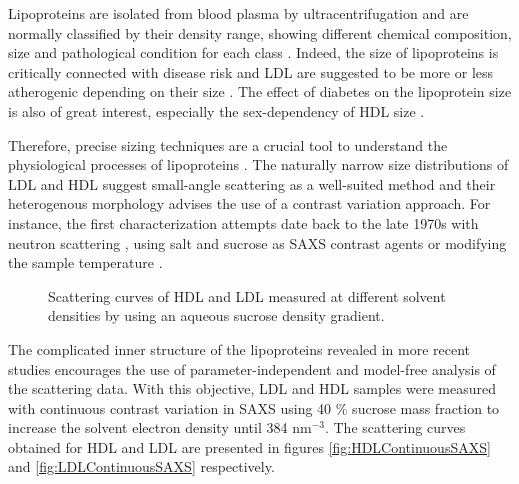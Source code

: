 Lipoproteins are isolated from blood plasma by ultracentrifugation \citep{havel_distribution_1955} and are normally classified by their density range, showing different chemical composition, size and pathological condition for each class \citep{german_lipoproteins:_2006}. Indeed, the size of lipoproteins is critically connected with disease risk \citep{gardner_cd_association_1996} and LDL are suggested to be more or less atherogenic depending on their size \citep{dreon_low-density_1994}. The effect of diabetes on the lipoprotein size is also of great interest, especially the sex-dependency of HDL size \citep{colhoun_lipoprotein_2002}.

Therefore, precise sizing techniques are a crucial tool to understand the physiological processes of lipoproteins \citep{german_lipoproteins:_2006}. The naturally narrow size distributions of LDL and HDL suggest small-angle scattering as a well-suited method and their heterogenous morphology advises the use of a contrast variation approach. For instance, the first characterization attempts date back to the late 1970s with neutron scattering \citep{stuhrmann_neutron_1975}, using salt \citep{tardieu_structure_1976} and sucrose \citep{muller_structure_1978} as SAXS contrast agents or modifying the sample temperature \citep{laggner_molecular_1977,luzzati_structure_1979}. 

\begin{figure}
	\centering
		\subfloat[HDL]{\resizebox{0.44\linewidth}{!}{}\label{fig:HDLContinuousSAXS}}
		\subfloat[LDL]{\resizebox{0.44\linewidth}{!}{}\label{fig:LDLContinuousSAXS}}
		\caption[Continuous contrast variation experimental data of HDL and LDL.]{Scattering curves of HDL and LDL measured at different solvent densities by using an aqueous sucrose density gradient.}
\end{figure}

The complicated inner structure of the lipoproteins revealed in more recent studies \citep{baumstark_structure_1990,schnitzer_re-evaluation_1994} encourages the use of parameter-independent and model-free analysis of the scattering data. With this objective, LDL and HDL samples were measured with continuous contrast variation in SAXS using 40 $\%$ sucrose mass fraction to increase the solvent electron density until 384 nm$^{-3}$. The scattering curves obtained for HDL and LDL are presented in figures \ref{fig:HDLContinuousSAXS} and \ref{fig:LDLContinuousSAXS} respectively.

